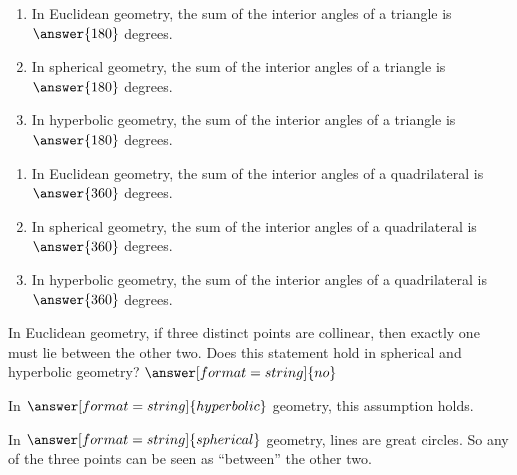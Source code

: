 \documentclass[nooutcomes]{ximera}
\begin{document}

\begin{problem}
\begin{enumerate}
\item In Euclidean geometry, the sum of the interior angles of a triangle is 
$\answer{180}$ degrees.
\item In spherical geometry, the sum of the interior angles of a triangle is 
$\answer{180}$ degrees.
\item In hyperbolic geometry, the sum of the interior angles of a triangle is 
$\answer{180}$ degrees.
\end{enumerate}
\end{problem}

\begin{problem}
\begin{enumerate}
\item In Euclidean geometry, the sum of the interior angles of a quadrilateral is 
$\answer{360}$ degrees.
\item In spherical geometry, the sum of the interior angles of a quadrilateral is 
$\answer{360}$ degrees.
\item In hyperbolic geometry, the sum of the interior angles of a quadrilateral is 
$\answer{360}$ degrees.
\end{enumerate}
\end{problem}

\begin{problem}
In Euclidean geometry, if three distinct points are collinear, then exactly one must lie between the other two.  Does this statement hold in spherical and hyperbolic geometry? 
$\answer[format=string]{no}$

\begin{problem}
In $\answer[format=string]{hyperbolic}$ geometry, this assumption holds. 

In $\answer[format=string]{spherical}$ geometry, lines are great circles.  So any of the three points can be seen as ``between'' the other two.  
\end{problem}
\end{problem}
\end{document}

